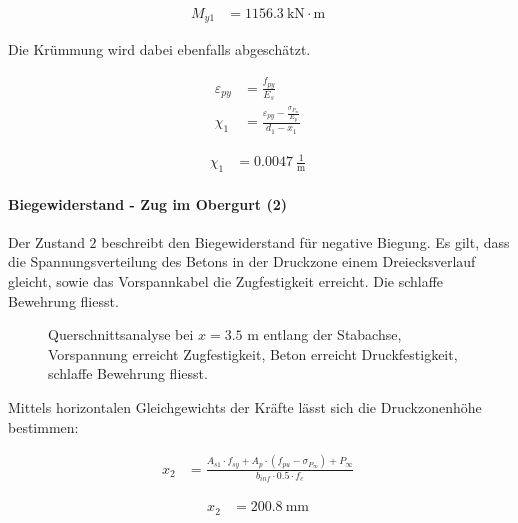 \documentclass[
  11pt,
  letterpaper,
]{scrreprt}
\let\oldparagraph\paragraph
\renewcommand{\paragraph}[1]{\oldparagraph{#1}\mbox{}}
\begin{document}
$$
\begin{aligned}
M_{y1} &= 1156.3\ \mathrm{kN} \cdot \mathrm{m} \;
\end{aligned}
$$

Die Krümmung wird dabei ebenfalls abgeschätzt.

$$
\begin{aligned}
\varepsilon_{py} &= \frac{ f_{py} }{ E_{s} } \; 
\\[10pt]
\chi_{1} &= \frac{ \varepsilon_{py} - \frac{ \sigma_{P_{\infty}} }{ E_{p} } }{ d_{1} - x_{1} } \; 
\end{aligned}
$$

$$
\begin{aligned}
\chi_{1} &= 0.0047\ \frac{1}{\mathrm{m}} \;
\end{aligned}
$$

\paragraph{Biegewiderstand - Zug im Obergurt
(2)}\label{biegewiderstand---zug-im-obergurt-2}

Der Zustand \(2\) beschreibt den Biegewiderstand für negative Biegung.
Es gilt, dass die Spannungsverteilung des Betons in der Druckzone einem
Dreiecksverlauf gleicht, sowie das Vorspannkabel die Zugfestigkeit
erreicht. Die schlaffe Bewehrung fliesst.

\begin{figure}[H]


\caption{\label{fig-t6_qs_MR_pos}Querschnittsanalyse bei \(x=3.5\) m
entlang der Stabachse, Vorspannung erreicht Zugfestigkeit, Beton
erreicht Druckfestigkeit, schlaffe Bewehrung fliesst.}

\end{figure}%

Mittels horizontalen Gleichgewichts der Kräfte lässt sich die
Druckzonenhöhe bestimmen:

$$
\begin{aligned}
x_{2} &= \frac{ A_{s1} \cdot f_{sy} + A_{p} \cdot \left( f_{pu} - \sigma_{P_{\infty}} \right) + P_{\infty} }{ b_{inf} \cdot 0.5 \cdot f_{c} } \; 
\end{aligned}
$$

$$
\begin{aligned}
x_{2} &= 200.8\ \mathrm{mm} \;
\end{aligned}
$$
\end{document}
